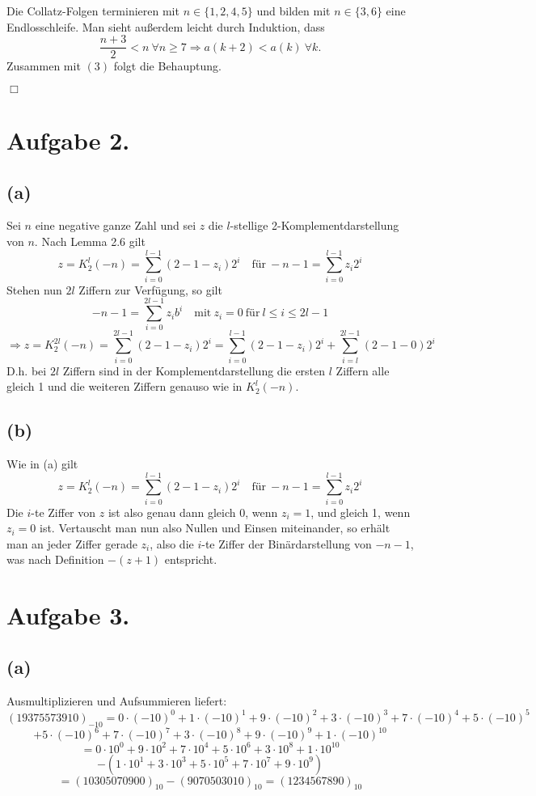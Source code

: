 \documentclass[a4paper, 11pt]{scrartcl}
\theoremstyle{dotless}
\begin{document}
	Die Collatz-Folgen terminieren mit $n\in\{1,2,4,5\}$ und bilden mit $n\in\{3,6\}$ eine Endlosschleife. Man sieht außerdem leicht durch Induktion, dass 
	\[
	\frac{n+3}{2}<n~\forall n\geq7 \Rightarrow a(k+2)<a(k)~\forall k.
	\]
	Zusammen mit $(3)$ folgt die Behauptung.
	\begin{flushright}
		$\Box$
	\end{flushright}
%
	\section*{Aufgabe 2.}
	\subsection*{(a)}
		Sei $n$ eine negative ganze Zahl und sei $z$ die $l$-stellige 2-Komplementdarstellung von $n$. Nach Lemma 2.6 gilt
		$$ z = K_2^l(-n) = \sum_{i=0}^{l-1}(2-1-z_i)2^i \quad\text{für}~-n-1=\sum_{i=0}^{l-1}z_i2^i $$ 
		Stehen nun $2l$ Ziffern zur Verfügung, so gilt
		$$-n-1=\sum_{i=0}^{2l-1}z_ib^i\quad \text{mit}~z_i=0~\text{für}~l\le i\le 2l-1$$
		$$\Rightarrow z = K_2^{2l}(-n) = \sum_{i=0}^{2l-1}(2-1-z_i)2^i = \sum_{i=0}^{l-1}(2-1-z_i)2^i + \sum_{i=l}^{2l-1}(2-1-0)2^i$$
		D.h. bei $2l$ Ziffern sind in der Komplementdarstellung die ersten $l$ Ziffern alle gleich 1 und die weiteren Ziffern genauso wie in $K_2^{l}(-n)$.
	\subsection*{(b)}
		Wie in (a) gilt
		$$ z = K_2^l(-n) = \sum_{i=0}^{l-1}(2-1-z_i)2^i \quad\text{für}~-n-1=\sum_{i=0}^{l-1}z_i2^i $$ 
		Die $i$-te Ziffer von $z$ ist also genau dann gleich 0, wenn $z_i=1$, und gleich 1, wenn $z_i=0$ ist. Vertauscht man nun also Nullen und Einsen miteinander, so erhält man an jeder Ziffer gerade $z_i$, also die $i$-te Ziffer der Binärdarstellung von $-n-1$, was nach Definition $-(z+1)$ entspricht.
	\section*{Aufgabe 3.}
	\subsection*{(a)}
		Ausmultiplizieren und Aufsummieren liefert:
		$$(19375573910)_{-10}=0\cdot (-10)^0+1\cdot (-10)^1+9\cdot (-10)^2 + 3\cdot (-10)^3+7\cdot (-10)^4+5\cdot(-10)^5$$$$+5\cdot (-10)^6+7\cdot (-10)^7+3\cdot (-10)^8+9\cdot (-10)^9 +1\cdot(-10)^{10}$$
		$$=0\cdot 10^0+9\cdot 10^2+7\cdot 10^4+5\cdot 10^6+3\cdot 10^8 +1\cdot10^{10}$$
		$$-(1\cdot 10^1+3\cdot 10^3+5\cdot 10^5+7\cdot 10^7+9\cdot 10^9)$$
		$$=(10305070900)_{10}-(9070503010)_{10}=(1234567890)_{10}$$
\end{document}
